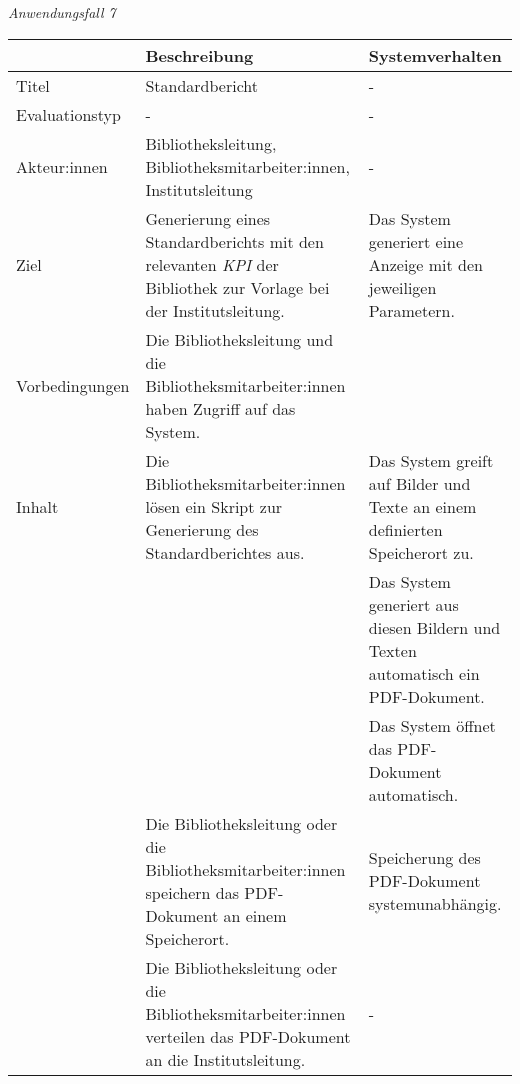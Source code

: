 
\newpage
\noindent
\textit{Anwendungsfall 7}

\begingroup
\setlength{\tabcolsep}{10pt} %
\renewcommand{\arraystretch}{1.25} 
\begin{table}[h]
    \centering
    \begin{adjustbox}{max width=\textwidth}
    \begin{tabular}{lp{7.0cm}p{7.0cm}}
       \toprule
       \textbf{}          & \textbf{Beschreibung} &\textbf{Systemverhalten}\\
       \midrule
        Titel                            &Standardbericht& -\\
        Evaluationstyp                   &-                   & -\\
        Akteur:innen                     &Bibliotheksleitung, Bibliotheksmitarbeiter:innen, Institutsleitung& -\\
        Ziel                             &Generierung eines Standardberichts mit den relevanten \textit{\acrshort{KPI}} der Bibliothek zur Vorlage bei der Institutsleitung. & Das System generiert eine Anzeige mit den jeweiligen Parametern.\\
        Vorbedingungen                   &Die Bibliotheksleitung und die Bibliotheksmitarbeiter:innen haben Zugriff auf das System.& \\
        Inhalt                           &Die Bibliotheksmitarbeiter:innen lösen ein Skript zur Generierung des Standardberichtes aus.& Das System greift auf Bilder und Texte an einem definierten Speicherort zu.\\
                                         & &Das System generiert aus diesen Bildern und Texten automatisch ein PDF-Dokument.\\
                                         & &Das System öffnet das PDF-Dokument automatisch.\\
                                         &Die Bibliotheksleitung oder die Bibliotheksmitarbeiter:innen speichern das PDF-Dokument an einem Speicherort. &Speicherung des PDF-Dokument systemunabhängig.\\
                                         &Die Bibliotheksleitung oder die Bibliotheksmitarbeiter:innen verteilen das PDF-Dokument an die Institutsleitung. &-\\


\end{tabular}
\end{adjustbox}
\end{table}
